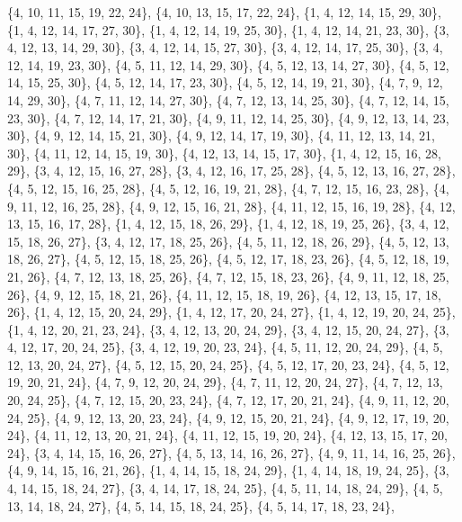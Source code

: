 \documentclass[11pt,a4paper]{article}
\begin{document}
{\{4, 10, 11, 15, 19, 22, 24\}, \{4, 10, 13, 15, 17, 22, 24\}, \{1, 4, 12, 14, 15, 29, 30\}, \{1, 4, 12, 14, 17, 27, 30\}, \{1, 4, 12, 14, 19, 25, 30\},
\{1, 4, 12, 14, 21, 23, 30\}, \{3, 4, 12, 13, 14, 29, 30\}, \{3, 4, 12, 14, 15, 27, 30\}, \{3, 4, 12, 14, 17, 25, 30\}, \{3, 4, 12, 14, 19, 23, 30\},
\{4, 5, 11, 12, 14, 29, 30\}, \{4, 5, 12, 13, 14, 27, 30\}, \{4, 5, 12, 14, 15, 25, 30\}, \{4, 5, 12, 14, 17, 23, 30\}, \{4, 5, 12, 14, 19, 21, 30\},
\{4, 7, 9, 12, 14, 29, 30\}, \{4, 7, 11, 12, 14, 27, 30\}, \{4, 7, 12, 13, 14, 25, 30\}, \{4, 7, 12, 14, 15, 23, 30\}, \{4, 7, 12, 14, 17, 21, 30\},
\{4, 9, 11, 12, 14, 25, 30\}, \{4, 9, 12, 13, 14, 23, 30\}, \{4, 9, 12, 14, 15, 21, 30\}, \{4, 9, 12, 14, 17, 19, 30\}, \{4, 11, 12, 13, 14, 21, 30\},
\{4, 11, 12, 14, 15, 19, 30\}, \{4, 12, 13, 14, 15, 17, 30\}, \{1, 4, 12, 15, 16, 28, 29\}, \{3, 4, 12, 15, 16, 27, 28\}, \{3, 4, 12, 16, 17, 25, 28\},
\{4, 5, 12, 13, 16, 27, 28\}, \{4, 5, 12, 15, 16, 25, 28\}, \{4, 5, 12, 16, 19, 21, 28\}, \{4, 7, 12, 15, 16, 23, 28\}, \{4, 9, 11, 12, 16, 25, 28\},
\{4, 9, 12, 15, 16, 21, 28\}, \{4, 11, 12, 15, 16, 19, 28\}, \{4, 12, 13, 15, 16, 17, 28\}, \{1, 4, 12, 15, 18, 26, 29\}, \{1, 4, 12, 18, 19, 25, 26\},
\{3, 4, 12, 15, 18, 26, 27\}, \{3, 4, 12, 17, 18, 25, 26\}, \{4, 5, 11, 12, 18, 26, 29\}, \{4, 5, 12, 13, 18, 26, 27\}, \{4, 5, 12, 15, 18, 25, 26\},
\{4, 5, 12, 17, 18, 23, 26\}, \{4, 5, 12, 18, 19, 21, 26\}, \{4, 7, 12, 13, 18, 25, 26\}, \{4, 7, 12, 15, 18, 23, 26\}, \{4, 9, 11, 12, 18, 25, 26\},
\{4, 9, 12, 15, 18, 21, 26\}, \{4, 11, 12, 15, 18, 19, 26\}, \{4, 12, 13, 15, 17, 18, 26\}, \{1, 4, 12, 15, 20, 24, 29\}, \{1, 4, 12, 17, 20, 24, 27\},
\{1, 4, 12, 19, 20, 24, 25\}, \{1, 4, 12, 20, 21, 23, 24\}, \{3, 4, 12, 13, 20, 24, 29\}, \{3, 4, 12, 15, 20, 24, 27\}, \{3, 4, 12, 17, 20, 24, 25\},
\{3, 4, 12, 19, 20, 23, 24\}, \{4, 5, 11, 12, 20, 24, 29\}, \{4, 5, 12, 13, 20, 24, 27\}, \{4, 5, 12, 15, 20, 24, 25\}, \{4, 5, 12, 17, 20, 23, 24\},
\{4, 5, 12, 19, 20, 21, 24\}, \{4, 7, 9, 12, 20, 24, 29\}, \{4, 7, 11, 12, 20, 24, 27\}, \{4, 7, 12, 13, 20, 24, 25\}, \{4, 7, 12, 15, 20, 23, 24\},
\{4, 7, 12, 17, 20, 21, 24\}, \{4, 9, 11, 12, 20, 24, 25\}, \{4, 9, 12, 13, 20, 23, 24\}, \{4, 9, 12, 15, 20, 21, 24\}, \{4, 9, 12, 17, 19, 20, 24\},
\{4, 11, 12, 13, 20, 21, 24\}, \{4, 11, 12, 15, 19, 20, 24\}, \{4, 12, 13, 15, 17, 20, 24\}, \{3, 4, 14, 15, 16, 26, 27\}, \{4, 5, 13, 14, 16, 26, 27\},
\{4, 9, 11, 14, 16, 25, 26\}, \{4, 9, 14, 15, 16, 21, 26\}, \{1, 4, 14, 15, 18, 24, 29\}, \{1, 4, 14, 18, 19, 24, 25\}, \{3, 4, 14, 15, 18, 24, 27\},
\{3, 4, 14, 17, 18, 24, 25\}, \{4, 5, 11, 14, 18, 24, 29\}, \{4, 5, 13, 14, 18, 24, 27\}, \{4, 5, 14, 15, 18, 24, 25\}, \{4, 5, 14, 17, 18, 23, 24\},
}
\end{document}
